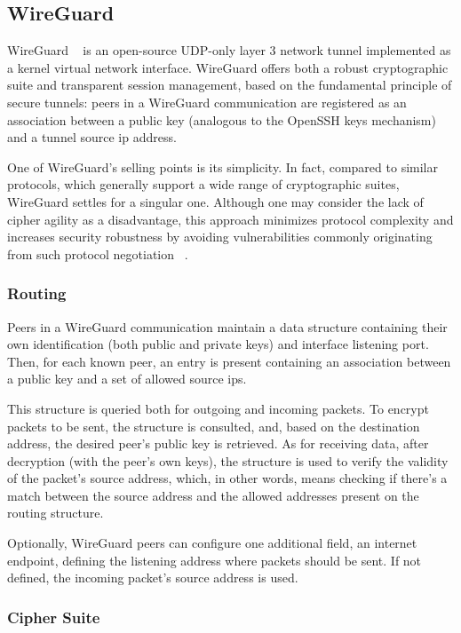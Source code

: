 \documentclass[11pt,twoside,a4paper]{report}
\begin{document}
\subsection{WireGuard}
\label{ss:wg}

WireGuard ~\cite{donenfeld2017wireguard} is an open-source UDP-only layer 3 network tunnel implemented as a kernel virtual network interface. WireGuard offers both a robust cryptographic suite and transparent session management, based on the fundamental principle of secure tunnels: peers in a WireGuard communication are registered as an association between a public key (analogous to the OpenSSH keys mechanism) and a tunnel source \ac{ip} address.

One of WireGuard's selling points is its simplicity. In fact, compared to similar protocols, which generally support a wide range of cryptographic suites, WireGuard settles for a singular one. Although one may consider the lack of cipher agility as a disadvantage, this approach minimizes protocol complexity and increases security robustness by avoiding vulnerabilities commonly originating from such protocol negotiation ~\cite{curguz2016vulnerabilities}.

\subsubsection{Routing}

Peers in a WireGuard communication maintain a data structure containing their own identification (both public and private keys) and interface listening port. Then, for each known peer, an entry is present containing an association between a public key and a set of allowed source \ac{ip}s.

This structure is queried both for outgoing and incoming packets. To encrypt packets to be sent, the structure is consulted, and, based on the destination address, the desired peer's public key is retrieved. As for receiving data, after decryption (with the peer's own keys), the structure is used to verify the validity of the packet's source address, which, in other words, means checking if there's a match between the source address and the allowed addresses present on the routing structure.

Optionally, WireGuard peers can configure one additional field, an internet endpoint, defining the listening address where packets should be sent. If not defined, the incoming packet's source address is used.

\subsubsection{Cipher Suite}
\end{document}
